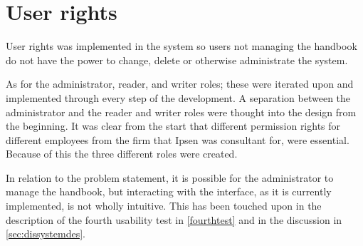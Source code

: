 \section{User rights}
User rights was implemented in the system so users not managing the handbook do not have the power to change, delete or otherwise administrate the system.

As for the administrator, reader, and writer roles; these were iterated upon and implemented through every step of the development.
A separation between the administrator and the reader and writer roles were thought into the design from the beginning.
It was clear from the start that different permission rights for different employees from the firm that Ipsen was consultant for, were essential.
Because of this the three different roles were created.

In relation to the problem statement, it is possible for the administrator to manage the handbook, but interacting with the interface, as it is currently implemented, is not wholly intuitive.
This has been touched upon in the description of the fourth usability test in \cref{fourthtest} and in the discussion in \cref{sec:dissystemdes}.
